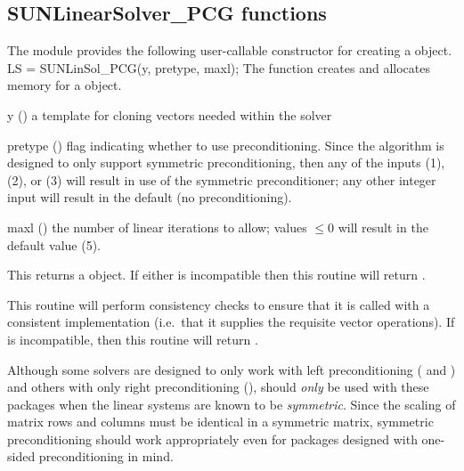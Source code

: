 \subsection{SUNLinearSolver\_PCG functions}
\label{ss:sunlinsol_pcg_functions}

The {\sunlinsolpcg} module provides the following user-callable constructor
for creating a \newline {} object.
%
%
{
  LS = SUNLinSol\_PCG(y, pretype, maxl);
}
{
  The function  creates and allocates memory for
  a {\pcg}  object.
}
{
  \begin{args}[pretype]
  \item[y] ()
    a template for cloning vectors needed within the solver
  \item[pretype] ()
    flag indicating whether to use preconditioning.
    Since the {\pcg} algorithm is designed to only support symmetric
    preconditioning, then any of the  inputs
     (1),  (2), or  (3)
    will result in use of the symmetric preconditioner;  any other
    integer input will result in the default (no preconditioning).
  \item[maxl] ()
    the number of linear iterations to allow; values $\le0$ will
    result in the default value (5).
  \end{args}
}
{
  This returns a  object.  If either  is
  incompatible then this routine will return .
}
{
  This routine will perform consistency checks to ensure that it is
  called with a consistent {\nvector} implementation (i.e.~that it
  supplies the requisite vector operations).  If  is
  incompatible, then this routine will return .

  Although some {\sundials} solvers are designed to only work
  with left preconditioning ({\ida} and {\idas}) and others with only
  right preconditioning ({\kinsol}), {\pcg} should \emph{only} be used
  with these packages when the linear systems are known to
  be \emph{symmetric}.  Since the scaling of matrix rows and columns
  must be identical in a symmetric matrix, symmetric preconditioning
  should work appropriately even for packages designed with one-sided
  preconditioning in mind.
}
